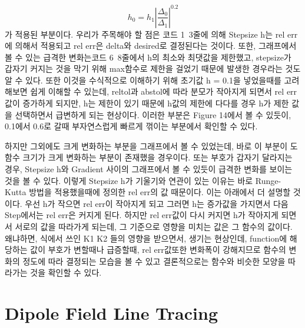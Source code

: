 \documentclass[11pt]{article}
\begin{document}
\begin{equation}
h_0 = h_1 \left| \frac{\Delta_0}{\Delta_1} \right|^{0.2}
\end{equation}
가 적용된 부분이다. 우리가 주목해야 할 점은 코드 1~3줄에 의해 Stepsize h는 rel err에 의해서 적용되고 rel err은 delta와 desired로 결정된다는 것이다. 또한, 그래프에서 볼 수 있는 급격한 변화는코드 6~8줄에서 h의 최소와 최댓값을 제한했고, stepsize가 갑자기 커지는 것을 막기 위해 max함수로 제한을 걸었기 때문에 발생한 경우라는 것도 알 수 있다. 또한 이것을 수식적으로 이해하기 위해 초기값 h = 0.1을 넣었을때를 고려해보면 쉽게 이해할 수 있는데, reltol과 abstol에 따라 분모가 작아지게 되면서 rel err값이 증가하게 되지만, h는 제한이 있기 때문에 h값의 제한에 다다를 경우 h가 제한 값을 선택하면서 급변하게 되는 현상이다. 이러한 부분은 Figure 14에서 볼 수 있듯이, 0.1에서 0.6로 갈때 부자연스럽게 빠르게 꺾이는 부분에서 확인할 수 있다.

하지만 그외에도 크게 변화하는 부분을 그래프에서 볼 수 있었는데, 바로 이 부분이 도함수 크기가 크게 변화하는 부분이 존재했을 경우이다. 또는 부호가 갑자기 달라지는 경우, Stepsize h와 Gradient 사이의 그래프에서 볼 수 있듯이 급격한 변화를 보이는 것을 볼 수 있다. 이렇게 Stepsize h가 기울기와 연관이 있는 이유는 바로 Runge-Kutta 방법을 적용했을때에 정의한 rel err의 값 때문이다. 이는 아래에서 더 설명할 것이다. 우선 h가 작으면 rel err이 작아지게 되고 그러면 h는 증가값을 가지면서 다음 Step에서는 rel err은 커지게 된다. 하지만 rel err값이 다시 커지면 h가 작아지게 되면서 서로의 값을 따라가게 되는데, 그 기준으로 영향을 미치는 값은 그 함수의 값이다. 왜냐하면, 식에서 쓰인 K1 K2 들의 영향을 받으면서, 생기는 현상인데, function에 해당하는 값이 부호가 변할때나 급증할때, rel err값또한 변화폭이 강해지므로 함수의 변화의 정도에 따라 결정되는 모습을 볼 수 있고 결론적으로는 함수와 비슷한 모양을 따라가는 것을 확인할 수 있다. 

\pagebreak































\section{Dipole Field Line Tracing}
\end{document}

